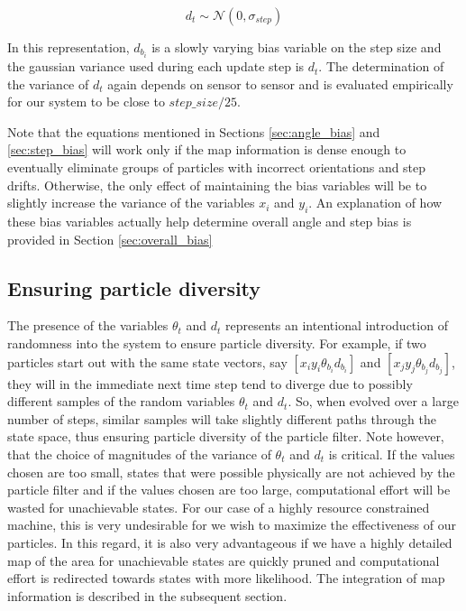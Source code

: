 \begin{equation}
d_{t} \sim \mathcal{N}(0, \sigma_{step})
\end{equation}

In this representation, $d_{b_i}$ is a slowly varying bias variable on the step
size and the gaussian variance used during each update step is $d_t$. The 
determination of the variance of $d_t$ again depends on sensor to sensor and 
is evaluated empirically for our system to be close to $step\_size/25$.

Note that the equations mentioned in Sections \ref{sec:angle_bias} and
\ref{sec:step_bias} will work only if the map information is dense enough to
eventually eliminate groups of particles with incorrect orientations and 
step drifts. Otherwise, the only effect of maintaining the bias variables will 
be to slightly increase the variance of the variables $x_i$ and $y_i$.
An explanation of how these bias variables actually help determine overall
angle and step bias is provided in Section \ref{sec:overall_bias}

\subsection{Ensuring particle diversity}

The presence of the variables $\theta_{t}$ and $d_t$ represents an 
intentional introduction of randomness into the system to ensure 
particle diversity. For example, if two particles start out with the same
state vectors, say 
$ [ x_i y_i \theta_{b_i} d_{b_i} ] $ and 
$ [ x_j y_j \theta_{b_j} d_{b_j} ] $, they will in the immediate 
next time step tend to diverge due to possibly different samples of the 
random variables $\theta_{t}$ and $d_t$. So, 
when evolved over a large number of steps, similar samples will take 
slightly different paths through the state space, thus ensuring particle 
diversity of the particle filter. Note however, that the choice of 
magnitudes of the variance of $\theta_t$ and $d_t$ is critical. If the 
values chosen are too small, states that were possible physically are 
not achieved by the particle filter and if the values chosen are too large,
computational effort will be wasted for unachievable states. For our case 
of a highly resource constrained machine, this is very undesirable for we
wish to maximize the effectiveness of our particles. In this regard, it is 
also very advantageous if we have a highly detailed map of the area for 
unachievable states are quickly pruned and computational effort is 
redirected towards states with more likelihood. The integration of 
map information is described in the subsequent section.

